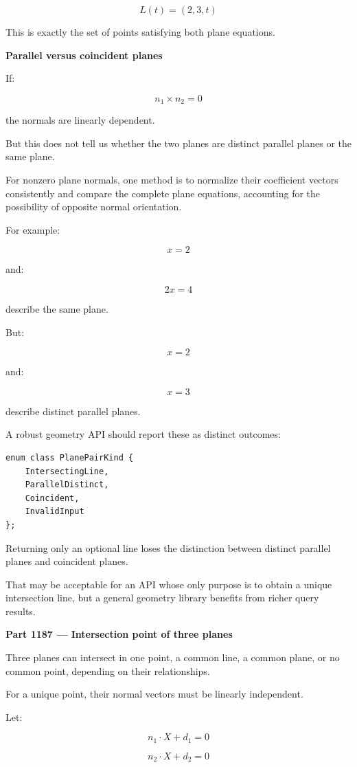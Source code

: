 \[
\boxed{ L(t)=(2,3,t) }
\]

This is exactly the set of points satisfying both plane equations.

\textbf{Parallel versus coincident planes}

If:

\[
n_1\times n_2=0
\]

the normals are linearly dependent.

But this does not tell us whether the two planes are distinct parallel planes or the same plane.

For nonzero plane normals, one method is to normalize their coefficient vectors consistently and compare the complete plane equations, accounting for the possibility of opposite normal orientation.

For example:

\[
x=2
\]

and:

\[
2x=4
\]

describe the same plane.

But:

\[
x=2
\]

and:

\[
x=3
\]

describe distinct parallel planes.

A robust geometry API should report these as distinct outcomes:

\begin{verbatim}
enum class PlanePairKind {
    IntersectingLine,
    ParallelDistinct,
    Coincident,
    InvalidInput
};
\end{verbatim}

Returning only an optional line loses the distinction between distinct parallel planes and coincident planes.

That may be acceptable for an API whose only purpose is to obtain a unique intersection line, but a general geometry library benefits from richer query results.

\textbf{Part 1187 --- Intersection point of three planes}

Three planes can intersect in one point, a common line, a common plane, or no common point, depending on their relationships.

For a unique point, their normal vectors must be linearly independent.

Let:

\[
n_1\cdot X+d_1=0
\]

\[
n_2\cdot X+d_2=0
\]

